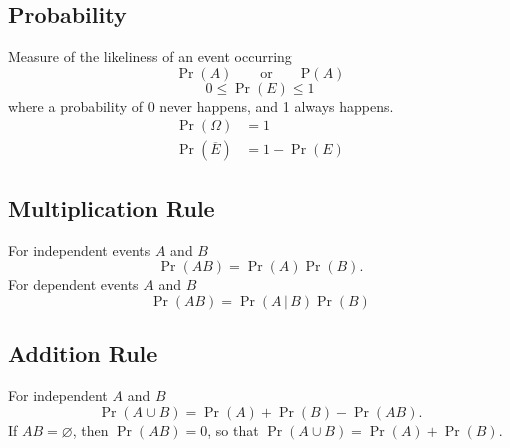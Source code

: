 \documentclass{article}
\begin{document}
\begin{multicols}{3}
    \subsection{Probability}
    Measure of the likeliness of an event occurring
    \begin{equation*}
        \Pr{\left( A \right)} \quad\quad \text{or} \quad\quad \mathrm{P}\left( A \right)
    \end{equation*}
    \begin{equation*}
        0 \leq \Pr{\left( E \right)} \leq 1
    \end{equation*}
    where a probability of 0 never happens, and 1 always happens.
    \begin{align*}
        \Pr{\left( \Omega \right)}       & = 1                         \\
        \Pr{\left( \overline{E} \right)} & = 1 - \Pr{\left( E \right)}
    \end{align*}
    \subsection{Multiplication Rule}
    For independent events \(A\) and \(B\)
    \begin{equation*}
        \Pr{\left( AB \right)} = \Pr{\left( A \right)} \Pr{\left( B \right)}.
    \end{equation*}
    For dependent events \(A\) and \(B\)
    \begin{equation*}
        \Pr{\left( AB \right)} = \Pr{\left( A \,\vert \, B \right)} \Pr{\left( B \right)}
    \end{equation*}
    \subsection{Addition Rule}
    For independent \(A\) and \(B\)
    \begin{equation*}
        \Pr{\left( A \cup B \right)} = \Pr{\left( A \right)} + \Pr{\left( B \right)} - \Pr{\left( AB \right)}.
    \end{equation*}
    If \(AB = \varnothing \), then \(\Pr{\left( AB \right)} = 0\), so that \(\Pr{\left( A \cup B \right)} = \Pr{\left( A \right)} + \Pr{\left( B \right)}\).

\end{multicols}
\end{document}
